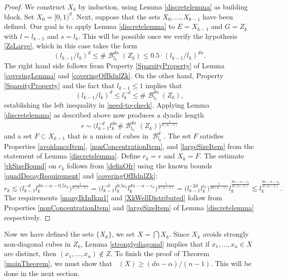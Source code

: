 \documentclass[dvipsnames,letterpaper,12pt]{article}
\numberwithin{equation}{section}
\theoremstyle{plain}
\theoremstyle{remark}
\DeclareMathOperator{\hausdim}{\dim_{\mathbf{H}}}
\DeclareMathOperator{\B}{\mathcal{B}}
\begin{document}
\begin{proof}
	We construct $X_k$ by induction, using Lemma \ref{discretelemma} as building block. Set $X_0=[0,1)^d$. Next, suppose that the sets $X_0, \ldots, X_{k-1}$ have been defined. Our goal is to apply Lemma \ref{discretelemma} to $E = X_{k-1}$ and $G = Z_k$ with $l = l_{k-1}$ and $s = l_k$. This will be possible once we verify the hypothesis \eqref{ZsLarge}, which in this case takes the form
	\begin{equation}
		(l_{k-1}/l_k)^d \leq \#\B_{l_k}^{dn}(Z_k) \leq 0.5 \cdot (l_{k-1}/l_k)^{dn}. \label{need-to-check}
	\end{equation}
	The right hand side follows from Property \ref{SparsityProperty} of Lemma \ref{coveringLemma} and \eqref{coveringOfBdnlZk}. 
	On the other hand, Property \ref{SparsityProperty} and the fact that $l_{k-1} \leq 1$ implies that
	\[ (l_{k-1}/l_k)^d\leq l_{k}^{-d}\leq \#\B_{l_k}^{dn}(Z_k), \]
	establishing the left inequality in \eqref{need-to-check}. Applying Lemma \ref{discretelemma} as described above now produces a dyadic length
	\begin{equation}\label{definOfr}
		r \sim \big(l_{k-1}^{-d}l_k^{dn} \# \B^{dn}_{l_k}(Z_k)\big)^{\frac{1}{d(n-1)}} 
	\end{equation}
	and a set $F\subset X_{k-1}$ that is a union of cubes in $\B_{l_k}^{d}$. The set $F$ satisfies Properties \ref{avoidanceItem}, \ref{nonConcentrationItem}, and \ref{largeSizeItem} from the statement of Lemma \ref{discretelemma}. Define $r_k=r$ and $X_k=F$. The estimate  \eqref{rkSizeBound} on $r_k$ follows from \eqref{definOfr} using the known bounds \eqref{quadDecayRequirement} and \eqref{coveringOfBdnlZk}:
	\[ r_k \lesssim \bigl( l_{k-1}^{-d}  l_k^{dn -\alpha - 0.5 \epsilon_k} \bigr)^{\frac{1}{d(n-1)}} = \bigl( l_{k-1}^{-d} l_k^{0.5 \epsilon_k} l_k^{dn -\alpha - \epsilon_k} \bigr)^{\frac{1}{d(n-1)}} = \bigl( l_{k-1}^{-2d} l_k^{\epsilon_k}\bigr)^{\frac{1}{2d(n-1)}} l_{k}^{\frac{dn-\alpha -\epsilon_k}{d(n-1)}} \lesssim l_{k}^{\frac{dn-\alpha -\epsilon_k}{d(n-1)}}. \]
	The requirements \eqref{manyIkInIkm1} and \eqref{XkWellDistributed} follow from Properties \ref{nonConcentrationItem} and \ref{largeSizeItem} of Lemma \ref{discretelemma} respectively.
\end{proof} 

Now we have defined the sets $\{ X_k \}$, we set $X = \bigcap X_k$. Since $X_k$ avoids strongly non-diagonal cubes in $Z_k$, Lemma \ref{stronglydiagonal} implies that if $x_1, \dots, x_n \in X$ are distinct, then $(x_1, \dots, x_n) \not \in Z$. To finish the proof of Theorem \ref{mainTheorem}, we must show that $\hausdim(X) \geq (dn - \alpha)/(n - 1)$. This will be done in the next section. 
\end{document}
